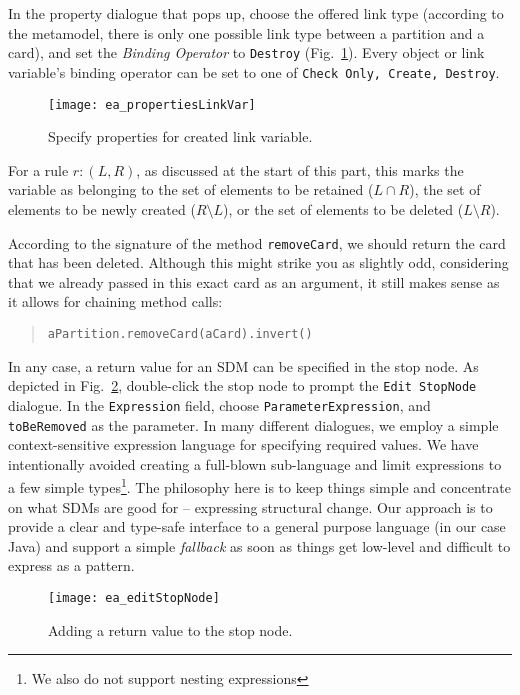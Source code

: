 In the property dialogue that pops up, choose the offered link type (according to the metamodel, there is only one possible link type between a partition and a
 card), and set the \emph{Binding Operator} to \texttt{Destroy} (Fig.~\ref{fig:link_variable_properties}). Every object or link
variable's binding operator can be set to one of \texttt{Check Only, Create, Destroy}.

\begin{figure}[htp]
\begin{center} 
 \texttt{[image: ea\_propertiesLinkVar]}
  \caption{Specify properties for created link variable.}  
  \label{fig:link_variable_properties}
\end{center}
\end{figure}


For a rule $r: (L, R)$, as discussed at the start of this part, this marks the variable as belonging to the set of elements to be retained ($L\cap R$), the
set of elements to be newly created ($R\setminus L$), or the set of elements to be deleted ($L\setminus R$).
 
According to the signature of the method \texttt{removeCard}, we should return the card that has been deleted. Although this might strike you as slightly odd,
considering that we already passed in this exact card as an argument, it still makes sense as it allows for chaining method calls:
\begin{quote}\texttt{aPartition.removeCard(aCard).invert()}\end{quote} 
In any case, a return value for an SDM can be specified in the stop node. As depicted in Fig.~\ref{fig:stop_node_return_value}, double-click the stop node to
prompt the \texttt{Edit StopNode} dialogue. In the \texttt{Expression} field, choose \texttt{ParameterExpression}, and \texttt{toBeRemoved} as the parameter. In
many different dialogues, we employ a simple context-sensitive expression language for specifying required values. We have intentionally avoided creating a
full-blown sub-language and limit expressions to a few simple types\footnote{We also do not support nesting expressions}.
The philosophy here is to keep things simple and concentrate on what SDMs are good for -- expressing structural change.
Our approach is to provide a clear and type-safe interface to a general purpose language (in our case Java) and support a simple \emph{fallback} as soon as
things get low-level and difficult to express as a pattern.

\begin{figure}[htp]
\begin{center}
  \texttt{[image: ea\_editStopNode]}
  \caption{Adding a return value to the stop node.}  
  \label{fig:stop_node_return_value}
\end{center}
\end{figure}

